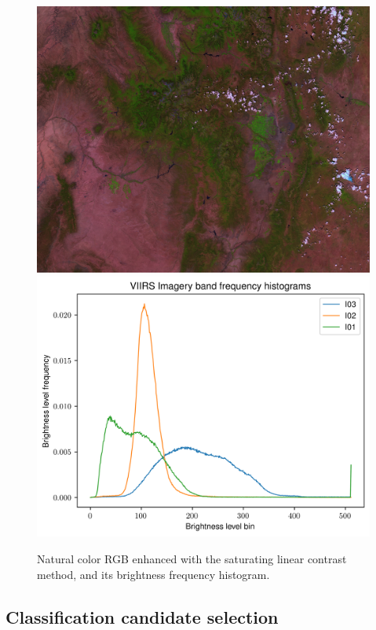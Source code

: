 \documentclass[12pt]{article}
\begin{document}
\begin{figure}[h!]
    \centering
    \includegraphics[width=.48\linewidth]{figures/p2/truecolor_contrast.png}
    \includegraphics[width=.48\linewidth]{figures/p2/img_histograms_contrast.png}
    \caption{Natural color RGB enhanced with the saturating linear contrast method, and its brightness frequency histogram.}
    \label{p2_histograms}
\end{figure}

\clearpage

\subsection{Classification candidate selection}
\end{document}
